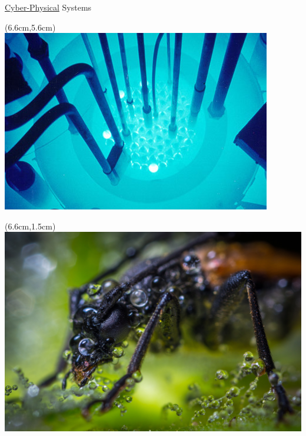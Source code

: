 \documentclass{beamer}
\begin{document}
\begin{frame}{\underline{Cyber-Physical} Systems}
\begin{textblock*}{5cm}(6.6cm,5.6cm)
\includegraphics[scale=0.32]{Images/nuclear.jpg}
\end{textblock*}

\begin{textblock*}{5cm}(6.6cm,1.5cm)
\includegraphics[scale=0.0357]{Images/beetle.jpg} 
\end{textblock*}
\end{frame}
\end{document}
